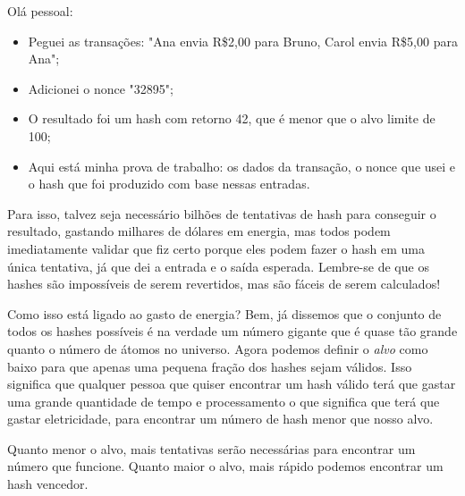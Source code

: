 Olá pessoal:
\begin{itemize}
\item Peguei as transações: "Ana envia R\$2,00 para Bruno, Carol envia R\$5,00 para Ana";
\item Adicionei o nonce "32895";
\item O resultado foi um hash com retorno 42, que é menor que o alvo limite de 100;
\item Aqui está minha prova de trabalho: os dados da transação, o nonce que usei e o hash que foi produzido com base nessas entradas.
\end{itemize}

Para isso, talvez seja necessário bilhões de tentativas de hash para conseguir o resultado, gastando milhares de dólares em energia, mas todos podem imediatamente validar que fiz certo porque eles podem fazer o hash em uma única tentativa, já que dei a entrada e o saída esperada. Lembre-se de que os hashes são impossíveis de serem revertidos, mas são fáceis de serem calculados!

Como isso está ligado ao gasto de energia? Bem, já dissemos que o conjunto de todos os hashes possíveis é na verdade um número gigante que é quase tão grande quanto o número de átomos no universo. Agora podemos definir o \textit{alvo} como baixo para que apenas uma pequena fração dos hashes sejam válidos. Isso significa que qualquer pessoa que quiser encontrar um hash válido terá que gastar uma grande quantidade de tempo e processamento o que significa que terá que gastar eletricidade, para encontrar um número de hash menor que nosso alvo.

Quanto menor o alvo, mais tentativas serão necessárias para encontrar um número que funcione. Quanto maior o alvo, mais rápido podemos encontrar um hash vencedor.